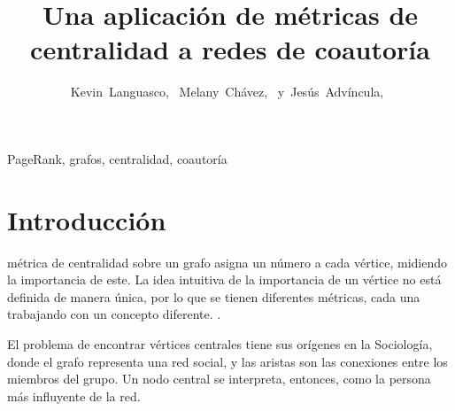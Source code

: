 \documentclass[journal]{IEEEtran}
\begin{document}
\title{Una aplicación de métricas de centralidad a redes de coautoría}
%
%
%

\author{Kevin~Languasco,~
        Melany~Chávez,~\IEEEmembership{}
        y~Jesús~Advíncula,~\IEEEmembership{}%
}

\maketitle

\begin{abstract}
\lipsum[1]
\end{abstract}

\begin{IEEEkeywords}
PageRank, grafos, centralidad, coautoría
\end{IEEEkeywords}

%
\IEEEpeerreviewmaketitle

\section{Introducción}
 métrica de centralidad sobre un grafo asigna un número a cada vértice, midiendo la importancia de este. La idea intuitiva de la importancia de un vértice no está definida de manera única, por lo que se tienen diferentes métricas, cada una trabajando con un concepto diferente. \cite{brandes}.

El problema de encontrar vértices centrales tiene sus orígenes en la Sociología, donde el grafo representa una red social, y las aristas son las conexiones entre los miembros del grupo. Un nodo central se interpreta, entonces, como la persona más influyente de la red.
\end{document}
